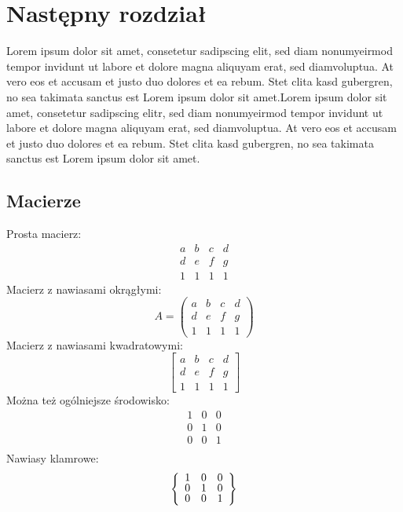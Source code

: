 \chapter{Następny rozdział}

Lorem ipsum dolor sit amet, consetetur sadipscing elit, sed diam nonumyeirmod tempor invidunt ut labore et dolore magna aliquyam erat, sed diamvoluptua. At vero eos et accusam et justo duo dolores et ea rebum. Stet clita kasd gubergren, no sea takimata sanctus est Lorem ipsum dolor sit amet.Lorem ipsum dolor sit amet, consetetur sadipscing elitr, sed diam nonumyeirmod tempor invidunt ut labore et dolore magna aliquyam erat, sed diamvoluptua. At vero eos et accusam et justo duo dolores et ea rebum. Stet clita kasd gubergren, no sea takimata sanctus est Lorem ipsum dolor sit amet.


\section{Macierze}

Prosta macierz:
\[
\begin{matrix}
a & b & c & d \\
d & e & f & g \\
1 & 1 & 1 & 1
\end{matrix}
\]
Macierz z nawiasami okrągłymi:
\[
A = 
\begin{pmatrix}
a & b & c & d \\
d & e & f & g \\
1 & 1 & 1 & 1
\end{pmatrix}
\]
Macierz z nawiasami kwadratowymi:
\[
\begin{bmatrix}
a & b & c & d \\
d & e & f & g \\
1 & 1 & 1 & 1
\end{bmatrix}
\]
Można też ogólniejsze środowisko:
\[
\renewcommand{\arraystretch}{0.8}
\begin{array}{ccc}
1 & 0 & 0 \\
0 & 1 & 0 \\
0 & 0 & 1 \\
\end{array}
\]
Nawiasy klamrowe:
\[
\left\{
\renewcommand{\arraystretch}{0.8}
\begin{array}{ccc}
1 & 0 & 0 \\
0 & 1 & 0 \\
0 & 0 & 1 \\
\end{array}\right\}
\]

